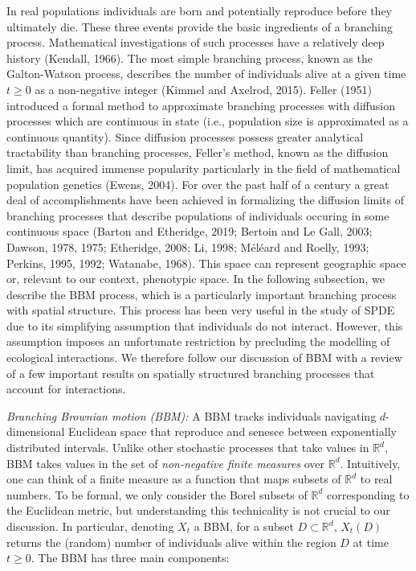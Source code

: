 \documentclass[]{elsarticle} %
\begin{document}
In real populations individuals are born and potentially reproduce
before they ultimately die. These three events provide the basic
ingredients of a branching process. Mathematical investigations of such
processes have a relatively deep history (Kendall, 1966). The most
simple branching process, known as the Galton-Watson process, describes
the number of individuals alive at a given time \(t\geq0\) as a
non-negative integer (Kimmel and Axelrod, 2015). Feller (1951)
introduced a formal method to approximate branching processes with
diffusion processes which are continuous in state (i.e., population size
is approximated as a continuous quantity). Since diffusion processes
possess greater analytical tractability than branching processes,
Feller's method, known as the diffusion limit, has acquired immense
popularity particularly in the field of mathematical population genetics
(Ewens, 2004). For over the past half of a century a great deal of
accomplishments have been achieved in formalizing the diffusion limits
of branching processes that describe populations of individuals occuring
in some continuous space (Barton and Etheridge, 2019; Bertoin and Le
Gall, 2003; Dawson, 1978, 1975; Etheridge, 2008; Li, 1998; Méléard and
Roelly, 1993; Perkins, 1995, 1992; Watanabe, 1968). This space can
represent geographic space or, relevant to our context, phenotypic
space. In the following subsection, we describe the BBM process, which
is a particularly important branching process with spatial structure.
This process has been very useful in the study of SPDE due to its
simplifying assumption that individuals do not interact. However, this
assumption imposes an unfortunate restriction by precluding the
modelling of ecological interactions. We therefore follow our discussion
of BBM with a review of a few important results on spatially structured
branching processes that account for interactions.

\emph{Branching Brownian motion (BBM):} A BBM tracks individuals
navigating \(d\)-dimensional Euclidean space that reproduce and senesce
between exponentially distributed intervals. Unlike other stochastic
processes that take values in \(\mathbb{R}^d\), BBM takes values in the
set of \emph{non-negative finite measures} over \(\mathbb{R}^d\).
Intuitively, one can think of a finite measure as a function that maps
subsets of \(\mathbb{R}^d\) to real numbers. To be formal, we only
consider the Borel subsets of \(\mathbb{R}^d\) corresponding to the
Euclidean metric, but understanding this technicality is not crucial to
our discussion. In particular, denoting \(X_t\) a BBM, for a subset
\(D\subset\mathbb{R}^d\), \(X_t(D)\) returns the (random) number of
individuals alive within the region \(D\) at time \(t\geq0\). The BBM
has three main components:
\end{document}
